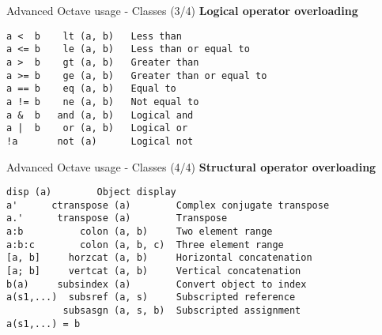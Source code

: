 \begin{frame}[fragile]{Advanced Octave usage - Classes (3/4)}
\textbf{Logical operator overloading}

\begin{lstlisting}[basicstyle=\normalfont,xleftmargin=4em]
a <  b    lt (a, b)   Less than
a <= b    le (a, b)   Less than or equal to
a >  b    gt (a, b)   Greater than
a >= b    ge (a, b)   Greater than or equal to
a == b    eq (a, b)   Equal to
a != b    ne (a, b)   Not equal to
a &  b   and (a, b)   Logical and
a |  b    or (a, b)   Logical or
!a       not (a)      Logical not
\end{lstlisting}
\end{frame}


\begin{frame}[fragile]{Advanced Octave usage - Classes (4/4)}
\textbf{Structural operator overloading}

\begin{lstlisting}[basicstyle=\normalfont,xleftmargin=4em]
              disp (a)        Object display
a'      ctranspose (a)        Complex conjugate transpose
a.'      transpose (a)        Transpose
a:b          colon (a, b)     Two element range
a:b:c        colon (a, b, c)  Three element range
[a, b]     horzcat (a, b)     Horizontal concatenation
[a; b]     vertcat (a, b)     Vertical concatenation
b(a)     subsindex (a)        Convert object to index
a(s1,...)  subsref (a, s)     Subscripted reference
          subsasgn (a, s, b)  Subscripted assignment
a(s1,...) = b
\end{lstlisting}
\end{frame}
